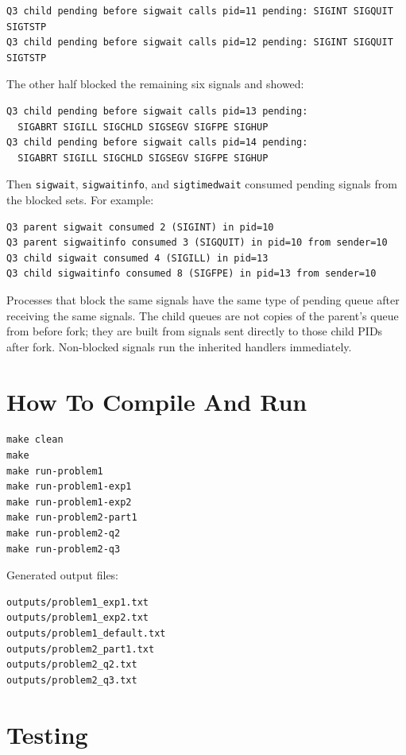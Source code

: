 \documentclass[11pt]{article}
\begin{document}
\begin{verbatim}
Q3 child pending before sigwait calls pid=11 pending: SIGINT SIGQUIT SIGTSTP
Q3 child pending before sigwait calls pid=12 pending: SIGINT SIGQUIT SIGTSTP
\end{verbatim}

The other half blocked the remaining six signals and showed:

\begin{verbatim}
Q3 child pending before sigwait calls pid=13 pending:
  SIGABRT SIGILL SIGCHLD SIGSEGV SIGFPE SIGHUP
Q3 child pending before sigwait calls pid=14 pending:
  SIGABRT SIGILL SIGCHLD SIGSEGV SIGFPE SIGHUP
\end{verbatim}

Then \texttt{sigwait}, \texttt{sigwaitinfo}, and \texttt{sigtimedwait} consumed
pending signals from the blocked sets. For example:

\begin{verbatim}
Q3 parent sigwait consumed 2 (SIGINT) in pid=10
Q3 parent sigwaitinfo consumed 3 (SIGQUIT) in pid=10 from sender=10
Q3 child sigwait consumed 4 (SIGILL) in pid=13
Q3 child sigwaitinfo consumed 8 (SIGFPE) in pid=13 from sender=10
\end{verbatim}

Processes that block the same signals have the same type of pending queue after
receiving the same signals. The child queues are not copies of the parent's queue
from before fork; they are built from signals sent directly to those child PIDs
after fork. Non-blocked signals run the inherited handlers immediately.

\section{How To Compile And Run}

\begin{verbatim}
make clean
make
make run-problem1
make run-problem1-exp1
make run-problem1-exp2
make run-problem2-part1
make run-problem2-q2
make run-problem2-q3
\end{verbatim}

Generated output files:

\begin{verbatim}
outputs/problem1_exp1.txt
outputs/problem1_exp2.txt
outputs/problem1_default.txt
outputs/problem2_part1.txt
outputs/problem2_q2.txt
outputs/problem2_q3.txt
\end{verbatim}

\section{Testing}
\end{document}
